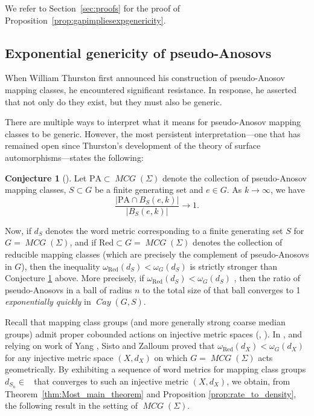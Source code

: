 \documentclass{amsart}
\numberwithin{thm}{section}
\numberwithin{figure}{section}
\theoremstyle{definition}
\newtheorem{conjecture}[thm]{Conjecture}
\theoremstyle{definition}
\theoremstyle{remark}
\numberwithin{equation}{section}
\DeclareMathOperator{\Cay}{\mathit{Cay}}
\DeclareMathOperator{\MCG}{\mathit{MCG}}
\DeclareMathOperator{\DDG}{\mathcal{D}(G)}
\theoremstyle{plain}
\begin{document}
We refer to Section~\ref{sec:proofs} for the proof of Proposition~\ref{prop:gapimpliesexpgenericity}.







\subsection{Exponential genericity of pseudo-Anosovs} When William Thurston first announced his construction of pseudo-Anosov mapping classes, he encountered significant resistance. In response, he asserted that not only do they exist, but they must also be generic. 

There are multiple ways to interpret what it means for pseudo-Anosov mapping classes to be generic. However, the most persistent interpretation—one that has remained open since Thurston's development of the theory of surface automorphisms—states the following:

\begin{conjecture}[{\cite[Conjecture~3.15]{FarbProblems}}]\label{conj:Farb} Let $\text{PA} \subset \MCG(\Sigma)$ denote the collection of pseudo-Anosov mapping classes, $S \subset G$ be a finite generating set and $e \in G$. As $k \rightarrow \infty$, we have 
\[ \frac{ |\text{PA} \cap B_S(e,k)|}{|B_S(e,k)|} \rightarrow 1.\]

\end{conjecture}



Now, if \( d_S \) denotes the word metric corresponding to a finite generating set \( S \) for \( G=\MCG(\Sigma) \), and if \( \text{Red} \subset G=\MCG(\Sigma) \) denotes the collection of reducible mapping classes (which are precisely the complement of pseudo-Anosovs in \( G \)), then the inequality  
$\omega_{\text{Red}}(d_S) < \omega_G(d_S)$
is strictly stronger than Conjecture \ref{conj:Farb} above. More precisely, if $\omega_{\text{Red}}(d_S) < \omega_G(d_S)$
, then the ratio of pseudo-Anosovs in a ball of radius \( n \) to the total size of that ball converges to 1 \emph{exponentially quickly} in $\Cay(G, S).$


Recall that mapping class groups (and more generally strong coarse median groups) admit proper cobounded actions on injective metric spaces (\cite{haettelhodapetyt:coarse}, \cite{PetytZalloum24}). In \cite{SistoZalloum2024}, and relying on work of Yang \cite{Yang2018}, Sisto and Zalloum proved that $\omega_{\text{Red}}({d_X}) < \omega_G(d_X)$ for any injective metric space $(X,d_X)$ on which $G=\MCG(\Sigma)$ acts geometrically. By exhibiting a sequence of word metrics for mapping class groups $d_{S_n} \in \DDG$ that converges to such an injective metric $(X,d_X)$, we obtain, from Theorem~\ref{thm:Most_main_theorem} and Proposition \ref{prop:rate_to_density}, the following result in the setting of $\MCG(\Sigma)$.
\end{document}
